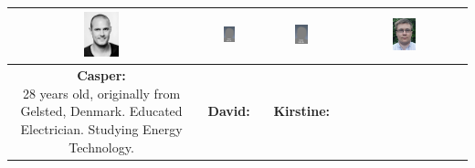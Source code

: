 \begin{table}[h]
\centering
\begin{tabular}{|c|c|c|c|}
\hline
\includegraphics[width=0.2\textwidth]{graphics/cgopic} & %
\includegraphics[width=0.2\textwidth]{graphics/AnonProfile} & %
\includegraphics[width=0.2\textwidth]{graphics/AnonProfile} & %
\includegraphics[width=0.2\textwidth]{graphics/Nikolaj_profile} \\ \hline %
\parbox[t] {0.2\textwidth}{
\textbf{Casper:} \\
28 years old, originally from Gelsted, Denmark. Educated Electrician. Studying Energy Technology.
}

&

\parbox[t] {0.2\textwidth}{
\textbf{David:} \\

} 

&

\parbox[t] {0.2\textwidth}{
\textbf{Kirstine:} \\

}
\end{tabular}
\end{table}
